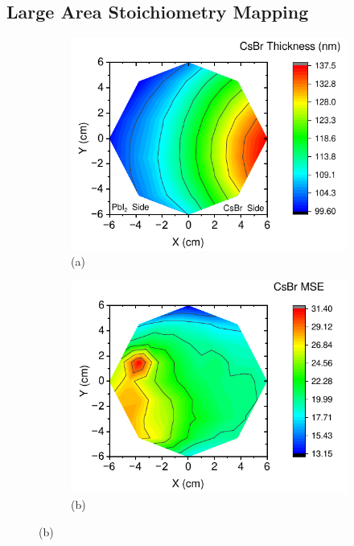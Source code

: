 \subsection{Large Area Stoichiometry Mapping}


\begin{figure}[ht!]
    \centering
    \begin{subfigure}[t]{0.49\textwidth}
        \centering
        \includegraphics[width=\textwidth]{chapters/stability/imeges/CsBrThickness.pdf} %
        \caption*{(a)}
    \end{subfigure}
    \hfill
    \begin{subfigure}[t]{0.49\textwidth}
        \centering
        \includegraphics[width=\textwidth]{chapters/stability/imeges/CsBrMSE.pdf} %
        \caption*{(b)}
    \end{subfigure}



\end{figure}
